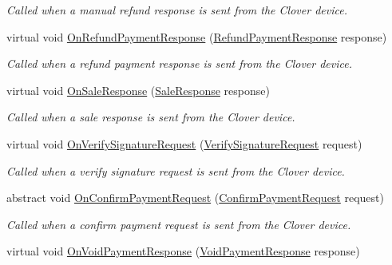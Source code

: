 \begin{DoxyCompactItemize}
\begin{DoxyCompactList}\small\item\em Called when a manual refund response is sent from the Clover device. \end{DoxyCompactList}\item 
virtual void \hyperlink{classcom_1_1clover_1_1remotepay_1_1sdk_1_1_default_clover_connector_listener_a9129ed4160946b687461c962c7af8e93}{On\+Refund\+Payment\+Response} (\hyperlink{classcom_1_1clover_1_1remotepay_1_1sdk_1_1_refund_payment_response}{Refund\+Payment\+Response} response)
\begin{DoxyCompactList}\small\item\em Called when a refund payment response is sent from the Clover device. \end{DoxyCompactList}\item 
virtual void \hyperlink{classcom_1_1clover_1_1remotepay_1_1sdk_1_1_default_clover_connector_listener_a1a562a3f2e2f786ada3beeeec083fe83}{On\+Sale\+Response} (\hyperlink{classcom_1_1clover_1_1remotepay_1_1sdk_1_1_sale_response}{Sale\+Response} response)
\begin{DoxyCompactList}\small\item\em Called when a sale response is sent from the Clover device. \end{DoxyCompactList}\item 
virtual void \hyperlink{classcom_1_1clover_1_1remotepay_1_1sdk_1_1_default_clover_connector_listener_a730846aaee619b9c0c6bf737ef4ff5e2}{On\+Verify\+Signature\+Request} (\hyperlink{classcom_1_1clover_1_1remotepay_1_1sdk_1_1_verify_signature_request}{Verify\+Signature\+Request} request)
\begin{DoxyCompactList}\small\item\em Called when a verify signature request is sent from the Clover device. \end{DoxyCompactList}\item 
abstract void \hyperlink{classcom_1_1clover_1_1remotepay_1_1sdk_1_1_default_clover_connector_listener_ae3a107836a054cedfac615a5fbe72469}{On\+Confirm\+Payment\+Request} (\hyperlink{classcom_1_1clover_1_1remotepay_1_1sdk_1_1_confirm_payment_request}{Confirm\+Payment\+Request} request)
\begin{DoxyCompactList}\small\item\em Called when a confirm payment request is sent from the Clover device. \end{DoxyCompactList}\item 
virtual void \hyperlink{classcom_1_1clover_1_1remotepay_1_1sdk_1_1_default_clover_connector_listener_acbffe77e24ba64632018d6c68dcdda33}{On\+Void\+Payment\+Response} (\hyperlink{classcom_1_1clover_1_1remotepay_1_1sdk_1_1_void_payment_response}{Void\+Payment\+Response} response)

\end{DoxyCompactItemize}
